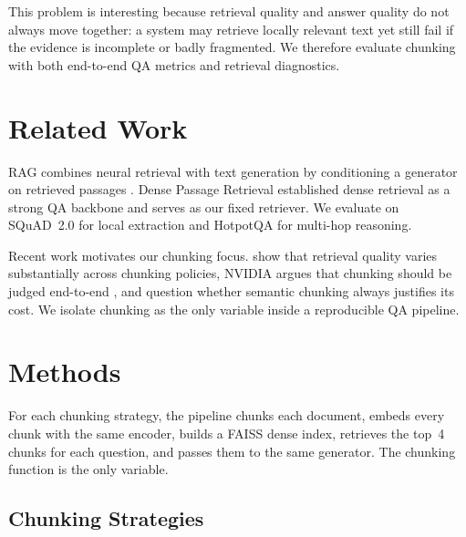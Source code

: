 \documentclass[11pt]{article}
\begin{document}
This problem is interesting because retrieval quality and answer quality do not always move together: a system may retrieve locally relevant text yet still fail if the evidence is incomplete or badly fragmented. We therefore evaluate chunking with both end-to-end QA metrics and retrieval diagnostics.

\section{Related Work}

RAG combines neural retrieval with text generation by conditioning a generator on retrieved passages \citep{lewis2020rag}. Dense Passage Retrieval \citep{karpukhin2020dpr} established dense retrieval as a strong QA backbone and serves as our fixed retriever. We evaluate on SQuAD~2.0 \citep{rajpurkar2018squad2} for local extraction and HotpotQA \citep{yang2018hotpotqa} for multi-hop reasoning.

Recent work motivates our chunking focus. \citet{smith2024chunking} show that retrieval quality varies substantially across chunking policies, NVIDIA argues that chunking should be judged end-to-end \citep{nvidia2024chunking}, and \citet{qu2024semanticchunking} question whether semantic chunking always justifies its cost. We isolate chunking as the only variable inside a reproducible QA pipeline.

\section{Methods}

For each chunking strategy, the pipeline chunks each document, embeds every chunk with the same encoder, builds a FAISS dense index, retrieves the top~4 chunks for each question, and passes them to the same generator. The chunking function is the only variable.

\subsection{Chunking Strategies}
\end{document}
